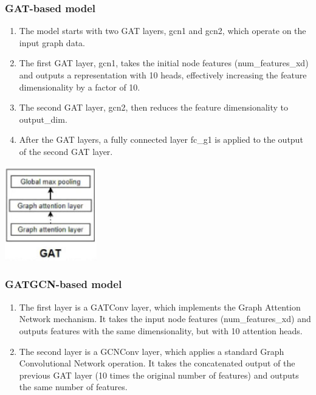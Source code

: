 \documentclass[11pt, a4paper]{article}
\begin{document}
            \subsubsection{GAT-based model}
                \begin{enumerate}
                    \item The model starts with two GAT layers, gcn1 and gcn2, which operate on the input graph data.
                    \item The first GAT layer, gcn1, takes the initial node features (num\_features\_xd) and outputs a representation with 10 heads, effectively increasing the feature dimensionality by a factor of 10.
                    \item The second GAT layer, gcn2, then reduces the feature dimensionality to output\_dim.
                    \item After the GAT layers, a fully connected layer fc\_g1 is applied to the output of the second GAT layer.
                \end{enumerate}

                \begin{center}
                    \includegraphics[width=0.3\textwidth]{GAT_model.PNG}
                \end{center}
            
            \subsubsection{GATGCN-based model}
                \begin{enumerate}
                    \item The first layer is a GATConv layer, which implements the Graph Attention Network mechanism. It takes the input node features (num\_features\_xd) and outputs features with the same dimensionality, but with 10 attention heads.
                    \item The second layer is a GCNConv layer, which applies a standard Graph Convolutional Network operation. It takes the concatenated output of the previous GAT layer (10 times the original number of features) and outputs the same number of features.
                \end{enumerate}
\end{document}
